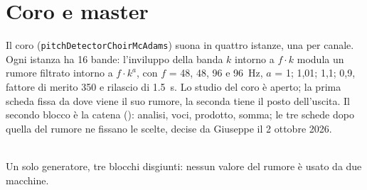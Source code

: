 \chapter{Coro e master}\label{cap:coro-master}
Il coro (\texttt{pitchDetectorChoirMcAdams}) suona in quattro istanze, una per canale.
Ogni istanza ha 16 bande: l'inviluppo della banda $k$ intorno a $f \cdot k$ modula un rumore filtrato intorno a $f \cdot k^{a}$, con $f$ = 48, 48, 96 e \qty{96}{\hertz}, $a$ = 1; 1,01; 1,1; 0,9, fattore di merito 350 e rilascio di \qty{1.5}{\second}.
Lo studio del coro è aperto; la prima scheda fissa da dove viene il suo rumore, la seconda tiene il posto dell'uscita.
Il secondo blocco è la catena (): analisi, voci, prodotto, somma; le tre schede dopo quella del rumore ne fissano le scelte, decise da Giuseppe il 2 ottobre 2026.

\begin{center}
\\[1mm]
{\small Un solo generatore, tre blocchi disgiunti: nessun valore del rumore è usato da due macchine.}
\end{center}

